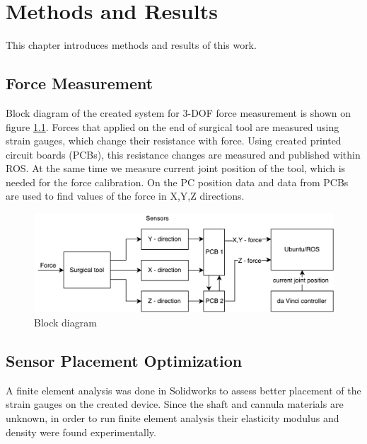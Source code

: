 
\chapter{Methods and Results}
\label{methods} %

This chapter introduces methods and results of this work. 

\section{Force Measurement}
\label{sec:sysArch}
Block diagram of the created system for 3-DOF force measurement is shown on figure \ref{fig:BlockDiag}. Forces that applied on the end of surgical tool are measured using strain gauges, which change their resistance with force. Using created printed circuit boards (PCBs), this resistance changes are measured and published within ROS. At the same time we measure current joint position of the tool, which is needed for the force calibration. On the PC position data and data from PCBs are used to find values of the force in X,Y,Z directions.

\begin{figure}[h]
	\begin{center}
		\includegraphics[width=140mm]{fig/methods/dbd2.pdf}
	\end{center}
	\vspace{-4mm}
	\caption[Block diagram]
	{Block diagram}
	\label{fig:BlockDiag}
	\vspace{-2mm}
\end{figure}

\section{Sensor Placement Optimization}
\label{sec:SimMod}
A finite element analysis was done in Solidworks to assess better placement of the strain gauges on the created device.  Since the shaft and cannula materials are unknown, in order to run finite element analysis their elasticity modulus and density were found experimentally.
	
